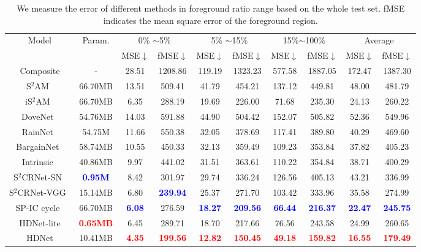 \documentclass[sigconf]{acmart}
\begin{document}
\begin{table*}[t]
	\centering
	\begin{tabular}{cccccccccc}
		\toprule
		\multirow{2}{*}{Model} &\multirow{2}{*}{Param.} & \multicolumn{2}{c}{0\% $\sim$5\%} & \multicolumn{2}{c}{5\% $\sim$15\%} & \multicolumn{2}{c}{15\%$\sim$100\%} &  \multicolumn{2}{c}{Average} \\ \cline{3-10}
		&&MSE$\downarrow$&fMSE$\downarrow$&MSE$\downarrow$&fMSE$\downarrow$&MSE$\downarrow$&fMSE$\downarrow$&MSE$\downarrow$&fMSE$\downarrow$\\
		\midrule
		Composite&-&28.51&1208.86&119.19&1323.23&577.58&1887.05 &172.47&1387.30\\
S$^{2}$AM~\cite{SSAM}&66.70MB&13.51&509.41&41.79&454.21&137.12&449.81&48.00&481.79 \\
		iS$^{2}$AM~\cite{sofiiuk2021foreground}&66.70MB& 6.35& 288.19&19.69 &226.00& 71.68&235.30&  24.13&260.22\\
		DoveNet~\cite{DoveNet}&54.76MB&14.03&591.88 & 44.90&504.42&152.07&505.82&52.36&549.96\\
		RainNet~\cite{RAIN}&54.75M&11.66&550.38& 32.05 &378.69&117.41&389.80&40.29&469.60\\
		
		BargainNet~\cite{Bargainnet}&58.74MB& 10.55 & 450.33 & 32.13 & 359.49 & 109.23 & 353.84 & 37.82 & 405.23\\ 
		Intrinsic~\cite{GuoZJGZ21} &40.86MB&9.97& 441.02&31.51&363.61 &110.22 & 354.84 &38.71& 400.29 \\
		S$^2$CRNet-SN~\cite{liang2021spatial}&\textbf{\textcolor{blue}{0.95M}} &8.42 &301.97& 29.74& 336.24& 126.56& 405.13& 43.21 &336.99\\
		S$^2$CRNet-VGG~\cite{liang2021spatial}&15.14MB &6.80& \textbf{\textcolor{blue}{239.94}}& 25.37& 271.70 &103.42 &333.96 &35.58 &274.99 \\
		SP-IC cycle~\cite{cai2023structure}& 66.70MB &\textbf{\textcolor{blue}{6.08}} &276.59 & \textbf{\textcolor{blue}{18.27}}&\textbf{\textcolor{blue}{209.56}}& \textbf{\textcolor{blue}{66.44}}& \textbf{\textcolor{blue}{216.37}}&\textbf{\textcolor{blue}{22.47}}&\textbf{\textcolor{blue}{245.75}}  \\
		\midrule
		HDNet-lite&\textbf{\textcolor{red}{0.65MB}}& 6.45&289.71&18.70& 217.66& 76.56&243.58&24.99& 260.65\\
		HDNet&10.41MB&\textbf{\textcolor{red}{4.35}}&\textbf{\textcolor{red}{199.56}}&\textbf{\textcolor{red}{12.82}}&\textbf{\textcolor{red}{150.45}}&\textbf{\textcolor{red}{49.18}}&\textbf{\textcolor{red}{159.82}}&\textbf{\textcolor{red}{16.55}}&\textbf{\textcolor{red}{179.49}}\\
		\bottomrule
	\end{tabular}
	\caption{We measure the error of different methods in foreground ratio range based on the whole test set. fMSE indicates the mean square error of the foreground region.}
	\label{tab:my_label}
\end{table*}
\end{document}
